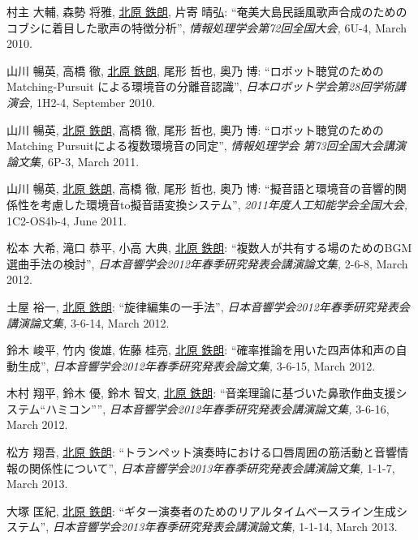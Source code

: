 \begin{Enumerate}
\item 
村主 大輔, 
森勢 将雅, 
\underline{北原 鉄朗}, 
片寄 晴弘: 
    ``奄美大島民謡風歌声合成のためのコブシに着目した歌声の特徴分析'', 
    {\it 情報処理学会第72回全国大会,
    } 6U-4, March 2010. 

\item 
山川 暢英, 
高橋 徹, 
\underline{北原 鉄朗}, 
尾形 哲也, 
奥乃 博: 
    ``ロボット聴覚のための Matching-Pursuit による環境音の分離音認識'', 
    {\it 日本ロボット学会第28回学術講演会,
    } 1H2-4, September 2010. 

\item 
山川 暢英, 
\underline{北原 鉄朗}, 
高橋 徹, 
尾形 哲也, 
奧乃 博: 
    ``ロボット聴覚のためのMatching Pursuitによる複数環境音の同定'', 
    {\it 情報処理学会 第73回全国大会講演論文集,
    } 6P-3, March 2011. 

\item 
山川 暢英, 
\underline{北原 鉄朗}, 
高橋 徹, 
尾形 哲也, 
奥乃 博: 
    ``擬音語と環境音の音響的関係性を考慮した環境音to擬音語変換システム'', 
    {\it 2011年度人工知能学会全国大会,
    } 1C2-OS4b-4, June 2011. 

\item 
松本 大希, 
滝口 恭平, 
小高 大典, 
\underline{北原 鉄朗}: 
    ``複数人が共有する場のためのBGM選曲手法の検討'', 
    {\it 日本音響学会2012年春季研究発表会講演論文集,
    } 2-6-8, March 2012. 

\item 
土屋 裕一, 
\underline{北原 鉄朗}: 
    ``旋律編集の一手法'', 
    {\it 日本音響学会2012年春季研究発表会講演論文集,
    } 3-6-14, March 2012. 

\item 
鈴木 峻平, 
竹内 俊雄, 
佐藤 桂亮, 
\underline{北原 鉄朗}: 
    ``確率推論を用いた四声体和声の自動生成'', 
    {\it 日本音響学会2012年春季研究発表会論文集,
    } 3-6-15, March 2012. 

\item 
木村 翔平, 
鈴木 優, 
鈴木 智文, 
\underline{北原 鉄朗}: 
    ``音楽理論に基づいた鼻歌作曲支援システム“ハミコン”'', 
    {\it 日本音響学会2012年春季研究発表会講演論文集,
    } 3-6-16, March 2012. 

\item 
松方 翔吾, 
\underline{北原 鉄朗}: 
    ``トランペット演奏時における口唇周囲の筋活動と音響情報の関係性について'', 
    {\it 日本音響学会2013年春季研究発表会講演論文集,
    } 1-1-7, March 2013. 

\item 
大塚 匡紀, 
\underline{北原 鉄朗}: 
    ``ギター演奏者のためのリアルタイムベースライン生成システム'', 
    {\it 日本音響学会2013年春季研究発表会講演論文集,
    } 1-1-14, March 2013. 


\end{Enumerate}
